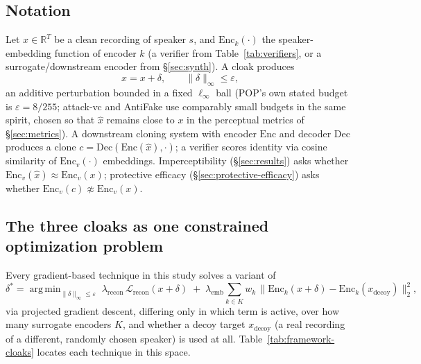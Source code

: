 \documentclass[11pt]{article}
\DeclareMathOperator*{\argmin}{arg\,min}
\begin{document}
\subsection{Notation}
\label{sec:framework-notation}
Let $x \in \mathbb{R}^T$ be a clean recording of speaker $s$, and
$\mathrm{Enc}_k(\cdot)$ the speaker-embedding function of encoder $k$
(a verifier from Table~\ref{tab:verifiers}, or a surrogate/downstream
encoder from \S\ref{sec:synth}). A cloak produces
\[
\hat{x} = x + \delta, \qquad \|\delta\|_\infty \leq \varepsilon,
\]
an additive perturbation bounded in a fixed $\ell_\infty$ ball (POP's
own stated budget is $\varepsilon = 8/255$; attack-vc and AntiFake use
comparably small budgets in the same spirit, chosen so that $\hat{x}$
remains close to $x$ in the perceptual metrics of
\S\ref{sec:metrics}). A downstream cloning system with encoder
$\mathrm{Enc}$ and decoder $\mathrm{Dec}$ produces a clone
$c = \mathrm{Dec}(\mathrm{Enc}(\hat{x}), \cdot)$; a verifier scores
identity via cosine similarity of $\mathrm{Enc}_v(\cdot)$ embeddings.
Imperceptibility (\S\ref{sec:results}) asks whether
$\mathrm{Enc}_v(\hat{x}) \approx \mathrm{Enc}_v(x)$; protective
efficacy (\S\ref{sec:protective-efficacy}) asks whether
$\mathrm{Enc}_v(c) \not\approx \mathrm{Enc}_v(x)$.

\subsection{The three cloaks as one constrained optimization problem}
\label{sec:framework-cloaks}
Every gradient-based technique in this study solves a variant of
\[
\delta^\ast = \argmin_{\|\delta\|_\infty \leq \varepsilon}
\; \lambda_{\mathrm{recon}}\, \mathcal{L}_{\mathrm{recon}}(x+\delta)
\;+\; \lambda_{\mathrm{emb}} \sum_{k \in K} w_k \,
\big\| \mathrm{Enc}_k(x+\delta) - \mathrm{Enc}_k(x_{\mathrm{decoy}}) \big\|_2^2,
\]
via projected gradient descent, differing only in which term is
active, over how many surrogate encoders $K$, and whether a decoy
target $x_{\mathrm{decoy}}$ (a real recording of a different, randomly
chosen speaker) is used at all. Table~\ref{tab:framework-cloaks}
locates each technique in this space.
\end{document}
